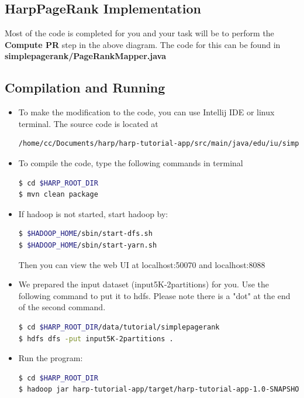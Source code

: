 \subsection*{HarpPageRank Implementation}
Most of the code is completed for you and your task will be to perform the
\textbf{Compute PR} step in the above diagram. The code for this can be found
in \textbf{simplepagerank/PageRankMapper.java}



\subsection*{Compilation and Running}
\begin{itemize}
\item To make the modification to the code, you can use Intellij IDE or linux
  terminal. The source code is located at 
\begin{lstlisting}[language=bash]
/home/cc/Documents/harp/harp-tutorial-app/src/main/java/edu/iu/simplepagerank
\end{lstlisting}
\item To compile the code, type the following commands in terminal
\begin{lstlisting}[language=bash]
$ cd $HARP_ROOT_DIR
$ mvn clean package
\end{lstlisting}

\item If hadoop is not started, start hadoop by:
\begin{lstlisting}[language=bash]
$ $HADOOP_HOME/sbin/start-dfs.sh
$ $HADOOP_HOME/sbin/start-yarn.sh
\end{lstlisting}

Then you can view the web UI at  localhost:50070 and localhost:8088

\item We prepared the input dataset (input5K-2partitions) for you. Use the
  following command to put it to hdfs. Please note there is a "dot" at the end
    of the second command.

\begin{lstlisting}[language=bash]
$ cd $HARP_ROOT_DIR/data/tutorial/simplepagerank
$ hdfs dfs -put input5K-2partitions .
\end{lstlisting}
\item Run the program:
\begin{lstlisting}[language=bash]
$ cd $HARP_ROOT_DIR
$ hadoop jar harp-tutorial-app/target/harp-tutorial-app-1.0-SNAPSHOT.jar edu.iu.simplepagerank.HarpPageRank input5K-2partitions output5k 5000 10
\end{lstlisting}


\end{itemize}
